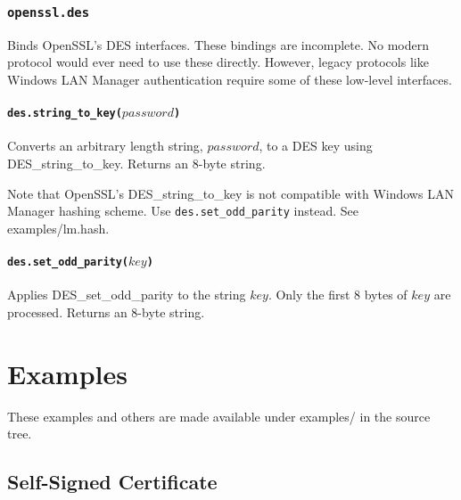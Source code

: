 \documentclass[11pt, oneside]{memoir}
\newcommand*{\fn}[1]{\texttt{#1}\xspace}
\newcounter{toccols}
\newenvironment{Module}[1]{
	\subsection{\texttt{#1}}
	\addtocontents{toc}{
		\protect\begin{multicols}{\value{toccols}}
	}
}{
	\addtocontents{toc}{\protect\end{multicols}}
}
\begin{document}
\begin{Module}{openssl.des}

Binds OpenSSL's DES interfaces. These bindings are incomplete. No modern protocol would ever need to use these directly. However, legacy protocols like Windows LAN Manager authentication require some of these low-level interfaces.

\subsubsection[\fn{des.string\_to\_key}]{\fn{des.string\_to\_key($password$)}}

Converts an arbitrary length string, $password$, to a DES key using DES\_string\_to\_key. Returns an 8-byte string.

Note that OpenSSL's DES\_string\_to\_key is not compatible with Windows LAN Manager hashing scheme. Use \fn{des.set\_odd\_parity} instead. See examples/lm.hash.

\subsubsection[\fn{des.set\_odd\_parity}]{\fn{des.set\_odd\_parity($key$)}}

Applies DES\_set\_odd\_parity to the string $key$. Only the first 8 bytes of $key$ are processed. Returns an 8-byte string.

\end{Module}


\chapter{Examples}

These examples and others are made available under examples/ in the source tree.

\section{Self-Signed Certificate}
\end{document}
